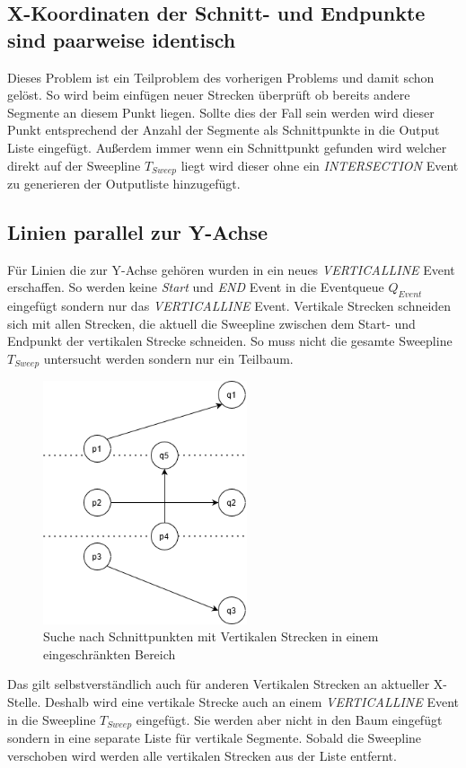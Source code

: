 \documentclass[conference]{IEEEtran}
\begin{document}
	\subsection{X-Koordinaten der Schnitt- und Endpunkte sind paarweise identisch}
	Dieses Problem ist ein Teilproblem des vorherigen Problems und damit schon gelöst.
	So wird beim einfügen neuer Strecken überprüft ob bereits andere Segmente an diesem Punkt liegen. Sollte dies der Fall sein werden wird dieser Punkt entsprechend der Anzahl der Segmente als Schnittpunkte in die Output Liste eingefügt. Außerdem immer wenn ein Schnittpunkt gefunden wird welcher direkt auf der Sweepline $T_{Sweep}$ liegt wird dieser ohne ein \textit{INTERSECTION} Event zu generieren der Outputliste hinzugefügt.
	
	\subsection{Linien parallel zur Y-Achse}
	Für Linien die zur Y-Achse gehören wurden in ein neues \textit{VERTICALLINE} Event erschaffen. So werden keine \textit{Start} und \textit{END} Event in die Eventqueue $Q_{Event}$ eingefügt sondern nur das \textit{VERTICALLINE} Event.
	Vertikale Strecken schneiden sich mit allen Strecken, die aktuell die Sweepline zwischen dem Start- und Endpunkt der vertikalen Strecke schneiden. So muss nicht die gesamte Sweepline $T_{Sweep}$ untersucht werden sondern nur ein Teilbaum.
	\begin{figure}[h]
		\begin{center}
			\includegraphics[width=6cm]{Vertikal.png}
			\caption{Suche nach Schnittpunkten mit Vertikalen Strecken in einem eingeschränkten Bereich}
			\label{figure_3}
		\end{center}
	\end{figure}
	Das gilt selbstverständlich auch für anderen Vertikalen Strecken an aktueller X-Stelle. Deshalb wird eine vertikale Strecke auch an einem \textit{VERTICALLINE} Event in die Sweepline $T_{Sweep}$ eingefügt. Sie werden aber nicht in den Baum eingefügt sondern in eine separate Liste für vertikale Segmente. Sobald die Sweepline verschoben wird werden alle vertikalen Strecken aus der Liste entfernt.
		
\end{document}
